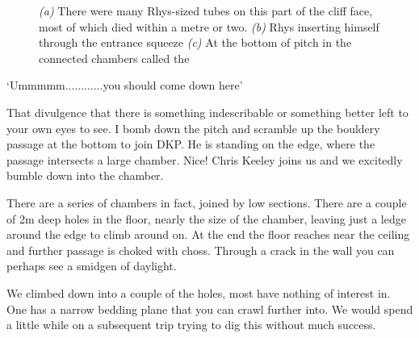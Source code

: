 \begin{figure*}[t!]
\checkoddpage \ifoddpage \forcerectofloat \else \forceversofloat \fi
\centering
\begin{subfigure}[t]{0.42\textwidth}
\centering
{}
 \caption{}\label{water chamber below helm's deep}
\end{subfigure}
    \hfill
    \begin{subfigure}[t]{0.56\textwidth}
        \centering
        \caption{} \label{HelmsDeep}
    \end{subfigure}
    
    \vspace{0.3cm}
    \begin{subfigure}[t]{\textwidth}
    \centering
        \caption{} \label{Touching the Void}
    \end{subfigure}
    \caption{
    \emph{(a)} There were many Rhys-sized tubes on this part of the cliff face, most of which died within a metre or two.
    \emph{(b)} Rhys inserting himself through the entrance squeeze 
    \emph{(c)} At the bottom of \protect{} pitch in the connected chambers called the \protect{} }
\end{figure*}

`Ummmmm............you should come down here'
 
 That divulgence that there is something indescribable or something better left to your own eyes to see. I bomb down the pitch and scramble up the bouldery passage at the bottom to join DKP. He is standing on the edge, where the passage intersects  a large chamber. Nice! Chris Keeley joins us and we excitedly bumble down into the chamber.
 
There are a series of chambers in fact, joined by low sections. There are a couple of 2m deep holes in the floor, nearly the size of the chamber, leaving just a ledge around the edge to climb around on. At the end the floor reaches near the ceiling and further passage is choked with choss. Through a crack in the wall you can perhaps see a smidgen of daylight.
 
We climbed down into a couple of the holes, most have nothing of interest in. One has a narrow bedding plane that you can crawl further into. We would spend a little while on a subsequent trip trying to dig this without much success. 
 
